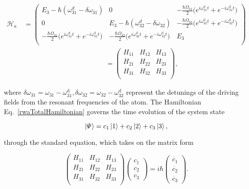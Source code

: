   {\small \begin{equation}
	  \begin{aligned}
		  \mathcal{H}_{a}\ & {= \begin{pmatrix}
		  E_3-\hbar(\omega_{31}^{d}-\delta\omega_{31}) & 0 & -\frac{\hbar\Omega_{31}}{2}\bigg(e^{i\omega^{\text{d}}_{31}t}+e^{-i\omega^{\text{d}}_{31}t}\bigg)  \\   	0 & E_3-\hbar(\omega_{32}^{d}-\delta\omega_{32})  & -\frac{\hbar\Omega_{32}}{2}\bigg(e^{i\omega^{\text{d}}_{32}t}+e^{-i\omega^{\text{d}}_{32}t}\bigg)  \\   	-\frac{\hbar\Omega_{31}}{2}\bigg(e^{i\omega^{\text{d}}_{31}t}+e^{-i\omega^{\text{d}}_{31}t}\bigg)  & -\frac{\hbar\Omega_{32}}{2}\bigg(e^{i\omega^{\text{d}}_{32}t}+e^{-i\omega^{\text{d}}_{32}t}\bigg) & E_3 \\
		  \end{pmatrix}}\\& \qquad\qquad\qquad\qquad\qquad\qquad = \begin{pmatrix}
		  H_{11} & H_{12} & H_{13} \\   	H_{21} & H_{22} & H_{23} \\   	H_{31} & H_{32} & H_{33} \\
		  \end{pmatrix},
	  \end{aligned}
	  \label{rwaTotalHamiltonian}
  \end{equation}}
  
  \noindent where $  \delta\omega_{31} = \omega_{31} - \omega^{\text{d}}_{31}, \delta\omega_{32} = \omega_{32} - \omega^{\text{d}}_{32}$ represent the detunings of the driving fields from the resonant frequencies of the atom. The Hamiltonian Eq.~\eqref{rwaTotalHamiltonian} governs the time evolution of the system state 
  
  \begin{equation}
	  \ket{\varPsi} = c_1\ket{1}+c_2\ket{2}+c_3\ket{3},
  \end{equation} 
  
  \noindent through the standard \schrodinger equation, which takes on the matrix form
  
  \begin{equation}
  \begin{pmatrix}
  H_{11} & H_{12} & H_{13} \\   	H_{21} & H_{22} & H_{23} \\   	H_{31} & H_{32} & H_{33} \\
  \end{pmatrix}\begin{pmatrix}
  c_1\\c_2\\c_3
  \end{pmatrix} = i\hbar\begin{pmatrix}
  \dot{c_1} \\ \dot{c_2}\\\dot{c_3}
  \end{pmatrix}.
  \label{rwaTotalHamilMatrix}
  \end{equation}
  
